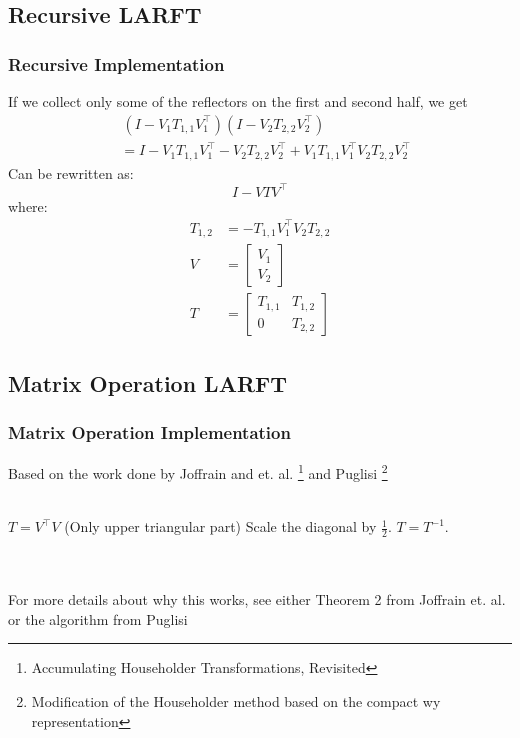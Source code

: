 \documentclass[12pt]{beamer}
\begin{document}
    \subsection{Recursive LARFT}
    \begin{frame}
        \frametitle{Recursive Implementation}
        If we collect only some of the reflectors on the first and second half, we get
        \begin{align*}
            &\,(I - V_1T_{1,1}V_1^\top)(I - V_2T_{2,2}V_2^\top) \\
            &= I - V_1T_{1,1}V_1^\top - V_2T_{2,2}V_2^\top + V_1T_{1,1}V_1^\top V_2T_{2,2}V_2^\top
        \end{align*}
        Can be rewritten as:
        $$
            I - VTV^\top
        $$
        where:
        \begin{align*}
            T_{1,2} &= -T_{1,1}V_1^\top V_2T_{2,2} \\
            V &= \begin{bmatrix}
                V_1 \\ V_2
            \end{bmatrix}\\
            T &= \begin{bmatrix}
                T_{1,1} & T_{1,2} \\
                0       & T_{2,2}
            \end{bmatrix}
        \end{align*}
    \end{frame}
    \subsection{Matrix Operation LARFT}
    \begin{frame}
        \frametitle{Matrix Operation Implementation}
        Based on the work done by Joffrain and et. al. \footnote{Accumulating Householder Transformations, Revisited} and Puglisi \footnote{Modification of the Householder method based on the compact wy representation}
        \\\,\\
        \begin{algorithmic}
            \State $T = V^\top V$ (Only upper triangular part)
            \State Scale the diagonal by $\frac{1}{2}$.
            \State $T = T^{-1}$.
        \end{algorithmic}
        \,\\\,\\
        For more details about why this works, see either Theorem 2 from Joffrain et. al. or the algorithm from Puglisi
    \end{frame}
\end{document}
